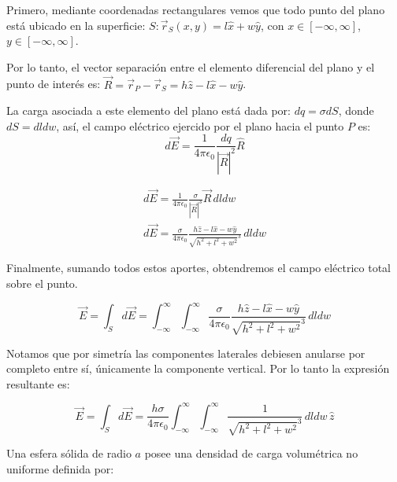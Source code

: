 \documentclass[11pt]{article}
\begin{document}
\begin{solucion}
    Primero, mediante coordenadas rectangulares vemos que todo punto del plano está ubicado en la superficie: $S: \vec{r}_S(x, y) = l\hat{x} + w\hat{y}$, con $x\in[-\infty, \infty]$, $y\in[-\infty, \infty]$.

    Por lo tanto, el vector separación entre el elemento diferencial del plano y el punto de interés es: $\vec{R} = \vec{r}_P - \vec{r}_S = h\hat{z} - l\hat{x} - w\hat{y}$.

    La carga asociada a este elemento del plano está dada por: $dq = \sigma dS$, donde $dS = dldw$, así, el campo eléctrico ejercido por el plano hacia el punto $P$ es:
    \begin{equation}
        d\vec{E} = \frac{1}{4\pi\epsilon_0}\frac{dq}{|\vec{R}|^2}\hat{R}
    \end{equation}

    \begin{align}
        d\vec{E} = \frac{1}{4\pi\epsilon_0}\frac{\sigma}{|\vec{R}|^3}\vec{R}\,dldw
        \\
        d\vec{E} = \frac{\sigma}{4\pi\epsilon_0}\frac{h\hat{z} - l\hat{x} - w\hat{y}}{\sqrt{h^2+l^2+w^2}^3}\,dldw
    \end{align}

    Finalmente, sumando todos estos aportes, obtendremos el campo eléctrico total sobre el punto.

    \begin{equation}
        \vec{E} = \int_S d\vec{E} = \int_{-\infty}^{\infty} \int_{-\infty}^{\infty}\frac{\sigma}{4\pi\epsilon_0}\frac{h\hat{z} - l\hat{x} - w\hat{y}}{\sqrt{h^2+l^2+w^2}^3}\,dldw
    \end{equation}

    Notamos que por simetría las componentes laterales debiesen anularse por completo entre sí, únicamente la componente vertical. Por lo tanto la expresión resultante es:

    \begin{equation}
        \vec{E} = \int_S d\vec{E} = \frac{h\sigma}{4\pi\epsilon_0} \int_{-\infty}^{\infty} \int_{-\infty}^{\infty} \frac{1}{\sqrt{h^2+l^2+w^2}^3}\,dldw\,\hat{z}
    \end{equation}

\end{solucion}

Una esfera sólida de radio $a$ posee una densidad de carga volumétrica no uniforme definida por:
\end{document}
